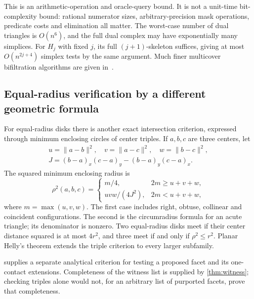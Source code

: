 This is an arithmetic-operation and oracle-query bound. It is not a unit-time bit-complexity bound: rational numerator sizes, arbitrary-precision mask operations, predicate costs and elimination all matter. The worst-case number of dual triangles is $O(n^6)$, and the full dual complex may have exponentially many simplices. For $H_j$ with fixed $j$, its full $(j+1)$-skeleton suffices, giving at most $O(n^{2j+4})$ simplex tests by the same argument. Much finer multicover bifiltration algorithms are given in~\cite{corbet,alonso}.

\subsection{Equal-radius verification by a different geometric formula}
For equal-radius disks there is another exact intersection criterion, expressed through minimum enclosing circles of center triples. If $a,b,c$ are three centers, let
\[
\begin{gathered}
u=\|a-b\|^2,\quad v=\|a-c\|^2,\quad w=\|b-c\|^2,\\
J=(b-a)_x(c-a)_y-(b-a)_y(c-a)_x.
\end{gathered}
\]
The squared minimum enclosing radius is
\begin{equation}\label{eq:mec}
\rho^2(a,b,c)=
\begin{cases}
m/4,&2m\ge u+v+w,\\[2pt]
uvw/(4J^2),&2m<u+v+w,
\end{cases}
\end{equation}
where $m=\max(u,v,w)$. The first case includes right, obtuse, collinear and coincident configurations. The second is the circumradius formula for an acute triangle; its denominator is nonzero. Two equal-radius disks meet if their center distance squared is at most $4r^2$, and three meet if and only if $\rho^2\le r^2$. Planar Helly's theorem extends the triple criterion to every larger subfamily.

 supplies a separate analytical criterion for testing a proposed facet and its one-contact extensions. Completeness of the witness list is supplied by \cref{thm:witness}; checking triples alone would not, for an arbitrary list of purported facets, prove that completeness.
